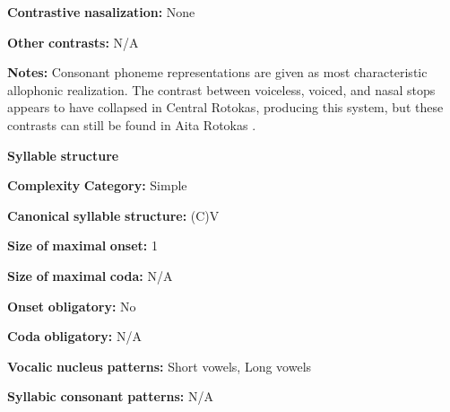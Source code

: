 \begin{styleBody}
\textbf{Contrastive} \textbf{nasalization:} None
\end{styleBody}

\begin{styleBody}
\textbf{Other} \textbf{contrasts:} N/A
\end{styleBody}

\begin{styleBody}
\textbf{Notes:} Consonant phoneme representations are given as most characteristic allophonic realization. The contrast between voiceless, voiced, and nasal stops appears to have collapsed in Central Rotokas, producing this system, but these contrasts can still be found in Aita Rotokas \citep{Robinson2006}.
\end{styleBody}

\begin{styleBody}
\textbf{Syllable} \textbf{structure}
\end{styleBody}

\begin{styleBody}
\textbf{Complexity} \textbf{Category:} Simple
\end{styleBody}

\begin{styleBody}
\textbf{Canonical} \textbf{syllable} \textbf{structure:} (C)V \citep[28-9]{Robinson2011}
\end{styleBody}

\begin{styleBody}
\textbf{Size} \textbf{of} \textbf{maximal} \textbf{onset:} 1
\end{styleBody}

\begin{styleBody}
\textbf{Size} \textbf{of} \textbf{maximal} \textbf{coda:} N/A
\end{styleBody}

\begin{styleBody}
\textbf{Onset} \textbf{obligatory:} No
\end{styleBody}

\begin{styleBody}
\textbf{Coda} \textbf{obligatory:} N/A
\end{styleBody}

\begin{styleBody}
\textbf{Vocalic} \textbf{nucleus} \textbf{patterns:} Short vowels, Long vowels
\end{styleBody}

\begin{styleBody}
\textbf{Syllabic} \textbf{consonant} \textbf{patterns:} N/A
\end{styleBody}

